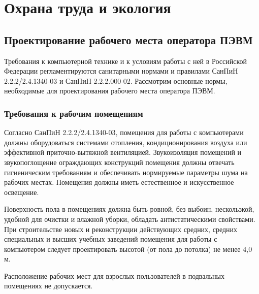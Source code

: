 \section{Охрана труда и экология}
\subsection{Проектирование рабочего места оператора ПЭВМ}
Требования к компьютерной технике и к условиям работы с ней в Российской Федерации регламентируются санитарными нормами и правилами СанПиН 2.2.2/2.4.1340-03 и СанПиН 2.2.2.000-02. Рассмотрим основные нормы, необходимые для проектирования рабочего места оператора ПЭВМ.
\subsubsection{Требования к рабочим помещениям}
Согласно СанПиН 2.2.2/2.4.1340-03, помещения для работы с компьютерами должны оборудоваться системами отопления, кондиционирования воздуха или эффективной приточно-вытяжной вентиляцией. Звукоизоляция помещений и звукопоглощение ограждающих конструкций помещения должны отвечать гигиеническим требованиям и обеспечивать нормируемые параметры шума на рабочих местах. Помещения должны иметь естественное и искусственное освещение.

Поверхность пола в помещениях должна быть ровной, без выбоин, нескользкой, удобной для очистки и влажной уборки, обладать антистатическими свойствами. При строительстве новых и реконструкции действующих средних, средних специальных и высших учебных заведений помещения для работы с компьютером следует проектировать высотой (от пола до потолка) не менее 4,0 м.

Расположение рабочих мест для взрослых пользователей в подвальных помещениях не допускается.
